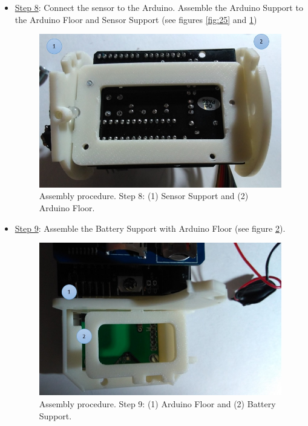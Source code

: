 \documentclass[12pt,letterpaper]{article}
\numberwithin{figure}{section}
\numberwithin{equation}{section}
\numberwithin{table}{section}
\begin{document}
\begin{itemize}
\item \underline{Step 8}: Connect the sensor to the Arduino. Assemble the Arduino Support to the Arduino Floor and Sensor Support (see figures \ref{fig:25} and \ref{fig:48})

    \begin{figure}[H]
        \centering
        \includegraphics[scale=0.5]{Figuras/figure_48.jpg}
        \caption{Assembly procedure. Step 8: (1) Sensor Support and (2) Arduino Floor.}
        \label{fig:48}    
    \end{figure}
    
    \item \underline{Step 9}: Assemble the Battery Support with Arduino Floor (see figure \ref{fig:49}). 
    
    \begin{figure}[H]
        \centering
        \includegraphics[scale=0.5]{Figuras/figure_49.jpg}
        \caption{Assembly procedure. Step 9: (1) Arduino Floor and (2) Battery Support.}
        \label{fig:49}    
    \end{figure}
    

\end{itemize}
\end{document}
